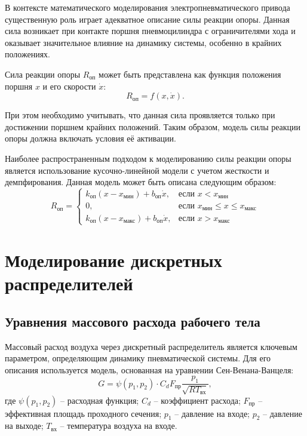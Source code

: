 В контексте математического моделирования электропневматического привода существенную роль играет
адекватное описание силы реакции опоры. Данная сила возникает при контакте поршня пневмоцилиндра
с ограничителями хода и оказывает значительное влияние на динамику системы, особенно в крайних положениях.

Сила реакции опоры $R_\text{оп}$ может быть представлена как функция положения поршня $x$ и его скорости $\dot{x}$:
\begin{equation*}
    R_\text{оп} = f(x, \dot{x}).
\end{equation*}

При этом необходимо учитывать, что данная сила проявляется только при достижении
поршнем крайних положений. Таким образом, модель силы реакции опоры должна включать
условия её активации.

Наиболее распространенным подходом к моделированию силы реакции опоры является использование кусочно-линейной модели с учетом жесткости и демпфирования. Данная модель может быть описана следующим образом:
\begin{equation}\label{eq:ch2/support_reaction}
    R_\text{оп} = \begin{cases}
        k_\text{оп}(x - x_\text{мин}) + b_\text{оп}\dot{x},  & \text{если } x < x_\text{мин}                       \\
        0,                                                   & \text{если } x_\text{мин} \leq x \leq x_\text{макс} \\
        k_\text{оп}(x - x_\text{макс}) + b_\text{оп}\dot{x}, & \text{если } x > x_\text{макс}
    \end{cases}
\end{equation}

\section{Моделирование дискретных распределителей}\label{sec:ch2/sec3}

\subsection{Уравнения массового расхода рабочего тела}\label{sec:ch2/sec3/subsec1}
Массовый расход воздуха через дискретный распределитель
является ключевым параметром, определяющим динамику пневматической
системы. Для его описания используется модель, основанная на уравнении Сен-Венана-Ванцеля:
\begin{equation}
    G = \psi(p_1, p_2) \cdot C_d F_\text{пр} \frac{p_1}{\sqrt{RT_\text{вх}}},
\end{equation}
где
$\psi(p_1, p_2)$ -- расходная функция;
$C_d$ -- коэффициент расхода;
$F_\text{пр}$ -- эффективная площадь проходного сечения;
$p_1$ -- давление на входе;
$p_2$ -- давление на выходе;
$T_\text{вх}$ -- температура воздуха на входе.

